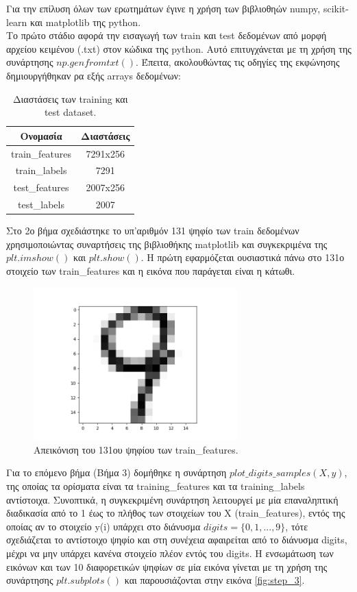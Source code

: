 \documentclass[11pt]{article} %
\begin{document}
Για την επίλυση όλων των ερωτημάτων έγινε η χρήση των βιβλιοθηών numpy, scikit-learn και matplotlib της python.\\
Το πρώτο στάδιο αφορά την εισαγωγή των train και test δεδομένων από μορφή αρχείου κειμένου (.txt) στον κώδικα της python. Αυτό επιτυγχάνεται με τη χρήση της συνάρτησης $np.genfromtxt()$. Έπειτα, ακολουθώντας τις οδηγίες της εκφώνησης δημιουργήθηκαν ρα εξής arrays δεδομένων:

\begin{table}[h]
\begin{center}
\begin{tabular}{c c }
\hline\hline
Ονομασία & Διαστάσεις \\
\hline
train\_features & 7291x256\\ 
train\_labels     & 7291      \\  
test\_features  & 2007x256\\
test\_labels      & 2007\\
\hline 
\end{tabular}
\caption{Διαστάσεις των training και test dataset.}
\end{center}
\end{table}

Στο 2ο βήμα σχεδιάστηκε το υπ'αριθμόν 131 ψηφίο των train δεδομένων χρησιμοποιώντας συναρτήσεις της βιβλιοθήκης matplotlib και συγκεκριμένα της $plt.imshow()$ και $plt.show()$. Η πρώτη εφαρμόζεται ουσιαστικά πάνω στο 131ο στοιχείο των train\_features και η εικόνα που παράγεται είναι η κάτωθι.

\begin{figure}[H]
    \centering
    \includegraphics[width=0.7\textwidth]{plots/Step 2}
    \caption{Απεικόνιση του 131ου ψηφίου των train\_features.}
    \label{fig:step_2}
\end{figure}

Για το επόμενο βήμα (Βήμα 3) δομήθηκε η συνάρτηση $plot\_digits\_samples(X, y)$, της οποίας τα ορίσματα είναι τα training\_features και τα training\_labels αντίστοιχα. Συνοπτικά, η συγκεκριμένη συνάρτηση λειτουργεί με μία επαναληπτική διαδικασία από το 1 έως το πλήθος των στοιχείων του X (train\_features), εντός της οποίας αν το στοιχείο y(i) υπάρχει στο διάνυσμα $digits = \{0,1,...,9\}$, τότε σχεδιάζεται το αντίστοιχο ψηφίο και στη συνέχεια αφαιρείται από το διάνυσμα digits, μέχρι να μην υπάρχει κανένα στοιχείο πλέον εντός του digits. Η ενσωμάτωση των εικόνων και των 10 διαφορετικών ψηφίων σε μία εικόνα γίνεται με τη χρήση της συνάρτησης $plt.subplots()$ και παρουσιάζονται στην εικόνα \ref{fig:step_3}.
\end{document}
